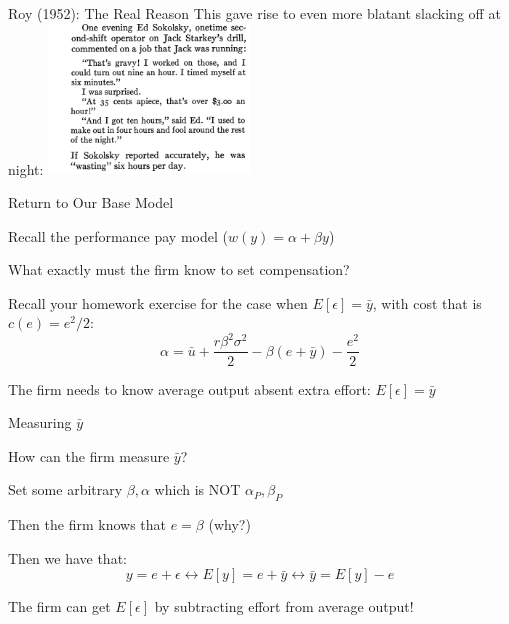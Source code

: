 \documentclass[aspectratio=169,usenames,dvipsnames]{beamer}
\newenvironment{wideitemize}{\itemize\addtolength{\itemsep}{10pt}}{\enditemize}
\begin{document}
\begin{frame}[c]{Roy (1952): The Real Reason}
This gave rise to even more blatant slacking off at night:
\centering
\includegraphics[width=0.4\textwidth]{pictures/roy_night.png}

\end{frame}




\begin{frame}{Return to Our Base Model}

\begin{wideitemize}
    \item Recall the performance pay model ($w(y)=\alpha+\beta y$)
    \item What exactly must the firm know to set compensation?
    \item Recall your homework exercise for the case when $E[\epsilon] = \bar y$, with cost that is $c(e)=e^2/2$:
    \[\alpha = \bar u+\frac{r\beta^2 \sigma^2}{2}-\beta (e+\bar y) -\frac{e^2}{2}\]
    \item The firm needs to know average output absent extra effort: $E[\epsilon]=\bar y$
\end{wideitemize}
    
\end{frame}


\begin{frame}{Measuring $\bar y$}

\begin{wideitemize}
    \item How can the firm measure $\bar y$?
    \item Set some arbitrary $\beta, \alpha$ which is NOT $\alpha_P, \beta_P$
    \item Then the firm knows that $e=\beta$ (why?)
    \item Then we have that:
    \[y = e + \epsilon \leftrightarrow E[y] = e + \bar y \leftrightarrow \bar y  = E[y]-e\]
    \item The firm can get $E[\epsilon]$ by subtracting effort from average output!
\end{wideitemize}
    
\end{frame}
\end{document}
